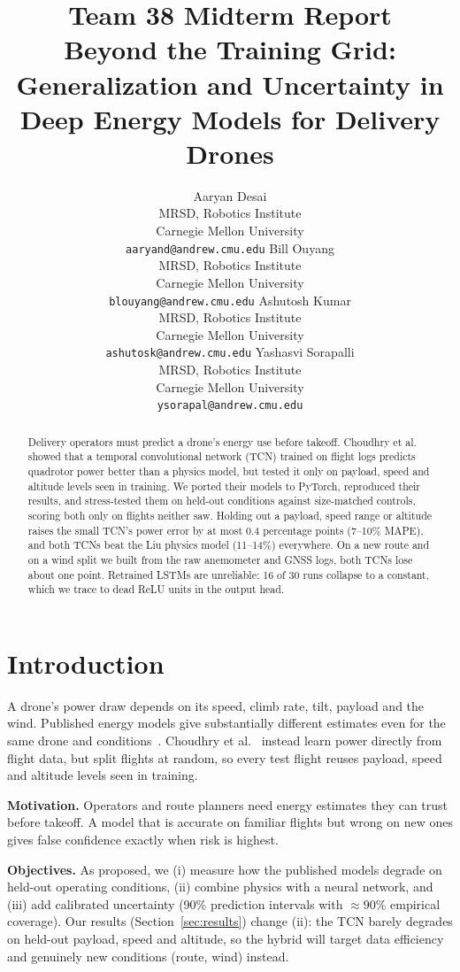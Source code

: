 \documentclass{article}
\title{Team 38 Midterm Report\\Beyond the Training Grid: Generalization and Uncertainty in Deep Energy Models for Delivery Drones}
\author{
  Aaryan Desai \\ MRSD, Robotics Institute \\ Carnegie Mellon University \\ \texttt{aaryand@andrew.cmu.edu} \And
  Bill Ouyang \\ MRSD, Robotics Institute \\ Carnegie Mellon University \\ \texttt{blouyang@andrew.cmu.edu} \AND
  Ashutosh Kumar \\ MRSD, Robotics Institute \\ Carnegie Mellon University \\ \texttt{ashutosk@andrew.cmu.edu} \And
  Yashasvi Sorapalli \\ MRSD, Robotics Institute \\ Carnegie Mellon University \\ \texttt{ysorapal@andrew.cmu.edu}
}
\begin{document}
\maketitle

\begin{abstract}
Delivery operators must predict a drone's energy use before takeoff. Choudhry et al.~\cite{choudhry2021} showed
that a temporal convolutional network (TCN) trained on flight logs predicts quadrotor power better than a physics
model, but tested it only on payload, speed and altitude levels seen in training. We ported their models to
PyTorch, reproduced their results, and stress-tested them on held-out conditions against size-matched controls,
scoring both only on flights neither saw. Holding out a payload, speed range or altitude raises the small TCN's
power error by at most 0.4 percentage points (7--10\% MAPE), and both TCNs beat the Liu physics model (11--14\%)
everywhere. On a new route and on a wind split we built from the raw anemometer and GNSS logs, both TCNs lose about
one point. Retrained LSTMs are unreliable: 16 of 30 runs collapse to a constant, which we trace to dead ReLU units
in the output head.
\end{abstract}

\section{Introduction}
A drone's power draw depends on its speed, climb rate, tilt, payload and the wind. Published energy models give
substantially different estimates even for the same drone and conditions~\cite{zhang2021}. Choudhry et
al.~\cite{choudhry2021} instead learn power directly from flight data, but split flights at random, so every test
flight reuses payload, speed and altitude levels seen in training.

\textbf{Motivation.} Operators and route planners need energy estimates they can trust before takeoff. A model
that is accurate on familiar flights but wrong on new ones gives false confidence exactly when risk is highest.

\textbf{Objectives.} As proposed, we (i) measure how the published models degrade on held-out operating conditions,
(ii) combine physics with a neural network, and (iii) add calibrated uncertainty (90\% prediction intervals with
$\approx$90\% empirical coverage). Our results (Section~\ref{sec:results}) change (ii): the TCN barely degrades on
held-out payload, speed and altitude, so the hybrid will target data efficiency and genuinely new conditions
(route, wind) instead.
\end{document}
